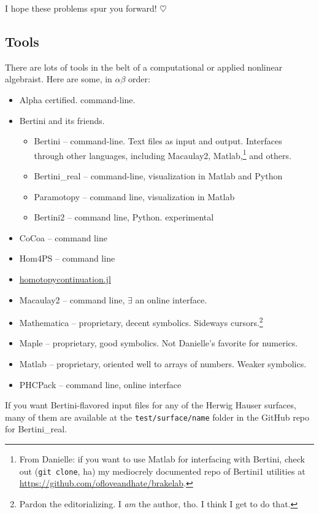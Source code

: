 \documentclass[letter,portrait]{article}
\newcommand{\1}{{\tt \_1}}
\newcommand{\2}{{\tt \_2}}
\begin{document}
I hope these problems spur you forward! $\heartsuit$

\subsection{Tools}

There are lots of tools in the belt of a computational or applied nonlinear algebraist.  Here are some, in $\alpha\beta$ order:

\begin{itemize}
\item Alpha certified. command-line.
\item Bertini and its friends.
		\begin{itemize}
			\item Bertini -- command-line.  Text files as input and output.  Interfaces through other languages, including Macaulay2, Matlab,\footnote{From Danielle: if you want to use Matlab for interfacing with Bertini, check out ({\tt git clone}, ha) my mediocrely documented repo of Bertini1 utilities at \url{https://github.com/ofloveandhate/brakelab}.} and others.  
	\item Bertini\_real -- command-line, visualization in Matlab and Python
	\item Paramotopy -- command line, visualization in Matlab
	\item Bertini2 -- command line, Python.  experimental
		\end{itemize}
\item CoCoa -- command line
\item Hom4PS -- command line
\item \href{https://www.juliahomotopycontinuation.org}{homotopycontinuation.jl}
\item Macaulay2 -- command line, $\exists$ an online interface.
\item Mathematica -- proprietary, decent symbolics.  Sideways cursors.\footnote{Pardon the editorializing.  I {\em am} the author, tho.  I think I get to do that.}
\item Maple -- proprietary, good symbolics.  Not Danielle's favorite for numerics.
\item Matlab -- proprietary, oriented well to arrays of numbers.  Weaker symbolics.
\item PHCPack -- command line, online interface

\end{itemize}


If you want Bertini-flavored input files for any of the Herwig Hauser surfaces, many of them are available at the {\tt test/surface/name} folder in the GitHub repo for Bertini\_real.
\end{document}
